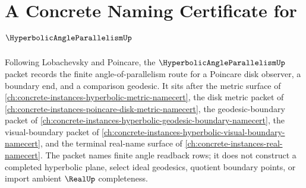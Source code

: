 \chapter{A Concrete Naming Certificate for $\HyperbolicAngleParallelismUp$}
\label{ch:concrete-instances-hyperbolic-angle-parallelism-namecert}

Following Lobachevsky and Poincare, the $\HyperbolicAngleParallelismUp$ packet records the finite angle-of-parallelism route for a Poincare disk observer, a boundary end, and a comparison geodesic. It sits after the metric surface of \autoref{ch:concrete-instances-hyperbolic-metric-namecert}, the disk metric packet of \autoref{ch:concrete-instances-poincare-disk-metric-namecert}, the geodesic-boundary packet of \autoref{ch:concrete-instances-hyperbolic-geodesic-boundary-namecert}, the visual-boundary packet of \autoref{ch:concrete-instances-hyperbolic-visual-boundary-namecert}, and the terminal real-name surface of \autoref{ch:concrete-instances-real-namecert}. The packet names finite angle readback rows; it does not construct a completed hyperbolic plane, select ideal geodesics, quotient boundary points, or import ambient $\RealUp$ completeness.

